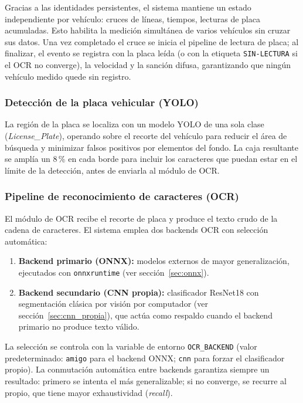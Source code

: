 \documentclass[11pt]{article}
\begin{document}
Gracias a las identidades persistentes, el sistema mantiene un estado independiente
por vehículo: cruces de líneas, tiempos, lecturas de placa acumuladas. Esto habilita
la medición simultánea de varios vehículos sin cruzar sus datos. Una vez completado
el cruce se inicia el pipeline de lectura de placa; al finalizar, el evento se
registra con la placa leída (o con la etiqueta \texttt{SIN-LECTURA} si el OCR no
converge), la velocidad y la sanción difusa, garantizando que ningún vehículo medido
quede sin registro.

\subsubsection{Detección de la placa vehicular (YOLO)}

La región de la placa se localiza con un modelo YOLO de una sola clase
(\emph{License\_Plate}), operando sobre el recorte del vehículo para reducir el área
de búsqueda y minimizar falsos positivos por elementos del fondo. La caja resultante
se amplía un 8\,\% en cada borde para incluir los caracteres que puedan estar en el
límite de la detección, antes de enviarla al módulo de OCR.

\subsubsection{Pipeline de reconocimiento de caracteres (OCR)}
\label{sec:ocr}

El módulo de OCR recibe el recorte de placa y produce el texto crudo de la cadena de
caracteres. El sistema emplea dos backends OCR con selección automática:

\begin{enumerate}
    \item \textbf{Backend primario (ONNX):} modelos externos de mayor generalización,
    ejecutados con \texttt{onnxruntime} (ver sección~\ref{sec:onnx}).
    \item \textbf{Backend secundario (CNN propia):} clasificador ResNet18 con
    segmentación clásica por visión por computador (ver sección~\ref{sec:cnn_propia}),
    que actúa como respaldo cuando el backend primario no produce texto válido.
\end{enumerate}

La selección se controla con la variable de entorno \texttt{OCR\_BACKEND} (valor
predeterminado: \texttt{amigo} para el backend ONNX; \texttt{cnn} para forzar el
clasificador propio). La conmutación automática entre backends garantiza siempre un
resultado: primero se intenta el más generalizable; si no converge, se recurre al
propio, que tiene mayor exhaustividad (\emph{recall}).
\end{document}
